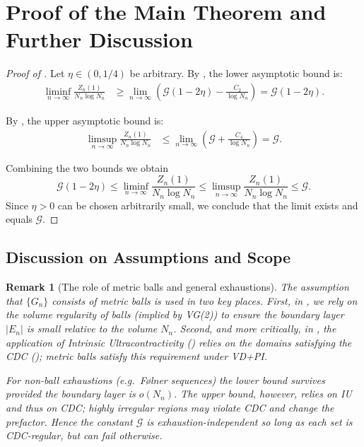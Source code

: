 \documentclass[11pt]{article}
\numberwithin{equation}{section}
\newtheorem{remark}[theorem]{Remark}
\newcommand{\cG}{\mathcal{G}}
\begin{document}
\section{Proof of the Main Theorem and Further Discussion}\label{sec:discussion}

\begin{proof}[Proof of ]
Let $\eta \in (0,1/4)$ be arbitrary. By , the lower asymptotic bound is:
\begin{align*}
\liminf_{n \to \infty} \frac{Z_n(1)}{N_n \log N_n} &\geq \lim_{n \to \infty} \left( \cG(1-2\eta) - \frac{C_2}{\log N_n} \right) = \cG(1-2\eta).
\end{align*}

By , the upper asymptotic bound is:
\begin{align*}
\limsup_{n \to \infty} \frac{Z_n(1)}{N_n \log N_n} &\leq \lim_{n \to \infty} \left( \cG + \frac{C_4}{\log N_n} \right) = \cG.
\end{align*}

Combining the two bounds we obtain
\[
\cG(1-2\eta) \leq \liminf_{n \to \infty} \frac{Z_n(1)}{N_n \log N_n} \leq \limsup_{n \to \infty} \frac{Z_n(1)}{N_n \log N_n} \leq \cG.
\]
Since $\eta > 0$ can be chosen arbitrarily small, we conclude that the limit exists and equals $\cG$.
\end{proof}

\subsection{Discussion on Assumptions and Scope}

\begin{remark}[The role of metric balls and general exhaustions]
The assumption that $\{G_n\}$ consists of metric balls is used in two key places. First, in , we rely on the volume regularity of balls (implied by VG(2)) to ensure the boundary layer $|E_n|$ is small relative to the volume $N_n$. Second, and more critically, in , the application of Intrinsic Ultracontractivity () relies on the domains satisfying the CDC (); metric balls satisfy this requirement under VD+PI.

For \emph{non-ball exhaustions} (e.g.\ Følner sequences) the lower bound survives provided the boundary layer is $o(N_n)$. The upper bound, however, relies on IU and thus on CDC; highly irregular regions may violate CDC and change the prefactor. Hence the constant $\cG$ is exhaustion-\emph{independent} so long as each set is CDC-regular, but can fail otherwise.
\end{remark}
\end{document}
